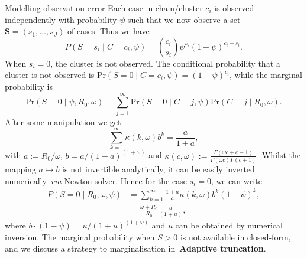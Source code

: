\documentclass[final]{beamer}
\newcommand{\disp}{\omega}					%
\newcommand{\chain}{c}							%
\newcommand{\seqrate}{\psi}					%
\newcommand{\nseqs}{J}		          %
\newcommand{\seq}{s}								%
\newcommand{\seqs}{\mathbf{S}}			%
\newlength{\colwidth}
\begin{document}
\begin{frame}[t]
\begin{columns}[t]
\begin{column}{\colwidth}
\begin{block}{Modelling observation error}
      Each  case in chain/cluster $\chain_i$ is observed independently with probability $\seqrate$ such that we now observe a set  $\seqs = (\seq_1, \ldots, \seq_\nseqs)$ of cases.
  Thus we have
  \begin{equation}
  \label{eq:binomial_error}
  P(S = \seq_i \mid  C = \chain_i, \seqrate) = \binom{\chain_i}{\seq_i} \seqrate^{\seq_i} (1-\seqrate)^{\chain_i-\seq_i}.
  \end{equation}
When $s_i = 0$, the cluster is not observed.
The conditional probability that a cluster is not observed is $\text{Pr}(S = 0 \mid C = c_i, \seqrate) = (1-\seqrate)^{c_i}$, while the marginal probability is
\begin{equation}
\label{eq:marg_zero_binomial}
\text{Pr}(S = 0 \mid \seqrate, R_0, \disp) = \sum_{j=1}^\infty \text{Pr}(S = 0 \mid  C = j, \seqrate)  \text{Pr}(C = j \mid R_0, \disp).
\end{equation}
After some manipulation we get
\begin{equation}
\label{eq:summation_weird}
 \sum_{k = 1}^\infty \kappa(k, \disp) b^k = \frac{a}{1 + a},
\end{equation}
with $ a := R_0/\disp$, $b = a/\left(1 + a\right)^{(1+\disp)}$ and $\kappa(\chain, \disp) :=  \frac{\Gamma(\disp \chain + \chain - 1)}{\Gamma(\disp \chain)\Gamma(\chain + 1)}$.
Whilst the mapping $a \mapsto b$ is not invertible analytically, it can be easily inverted numerically~\textit{via} Newton solver.
Hence for the case $s_i = 0$, we can write
\begin{align}
\nonumber
P(S  = 0 \mid R_0, \disp, \seqrate) &=  \sum_{k=1}^\infty  \frac{1 + a}{a} \kappa(k, \disp)b^k (1-\seqrate)^k, \\
\label{eq:probS0}
         &= \frac{\omega + R_0}{R_0} \frac{u}{(1 + u)},
\end{align}
where $b\cdot (1-\seqrate) = u/\left(1 + u\right)^{(1+\disp)}$ and $u$ can be obtained by numerical inversion.
The marginal probability when $S > 0$ is not available in closed-form, and we discuss a strategy to marginalisation in~\textbf{Adaptive truncation}.
      \end{block}


\end{column}
\end{columns}
\end{frame}
\end{document}
